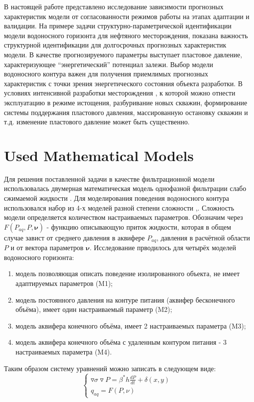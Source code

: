 \documentclass{article}
\begin{document}
	В настоящей работе представлено исследование зависимости прогнозных характеристик модели от согласованности режимов работы на этапах адаптации и валидации. На примере задачи структурно-параметрической идентификации модели водоносного горизонта для нефтяного месторождения, показана важность структурной идентификации для долгосрочных прогнозных характеристик модели. В качестве прогнозируемого параметры выступает пластовое давление, характеризующее “энергетический” потенциал залежи. Выбор модели водоносного контура важен для получения приемлимых прогнозных характеристик с точки зрения энергетического состояния объекта разработки. В условиях интенсивной разработки месторождения \cite{kos}, к которой можно отнести эксплуатацию в режиме истощения, разбуривание новых скважин, формирование системы поддержания пластового давления, массированную остановку скважин и т.д. изменение пластового давление может быть существенно.

\section{Used Mathematical Models}
Для решения поставленной задачи в качестве фильтрационной модели использовалась двумерная математическая модель однофазной фильтрации слабо сжимаемой жидкости \cite{bas}. Для моделирования поведения водоносного контура использовался набор из 4-х моделей разной степени сложности \cite{dake},\cite{fet}. Сложность модели определяется количеством настраиваемых параметров. Обозначим через $F(P_{aq}, P,\boldsymbol{\nu})$ - функцию описывающую приток жидкости, которая в общем случае завист от среднего давления в аквифере $P_{aq}$, давления в расчётной области $P$ и от вектора параметров $\boldsymbol{\nu}$. Исследование прводилось для четырёх моделей водоносного горизонта:
\begin{enumerate}
\item модель позволяющая описать поведение изолированного объекта, не имеет адаптируемых параметров (M1);
\item модель постоянного давления на контуре питания (аквифер бесконечного объёма), имеет один настраиваемый параметр (M2);
\item модель аквифера конечного объёма, имеет 2 настраиваемых параметра (M3); 
\item модель аквифера конечного объёма с удаленным контуром питания - 3 настраиваемых параметра (M4).
\end{enumerate}
Таким образом систему уравнений можно записать в следующем виде:
\begin{equation} \label{fil}
\left\{\begin{array}{crl}
\triangledown\sigma\triangledown P = \beta^*h\frac{dP}{dt}+\delta(x,y)\\
q_{aq} = F(P,\nu)
\end{array}\right.
\end{equation}
\end{document}
